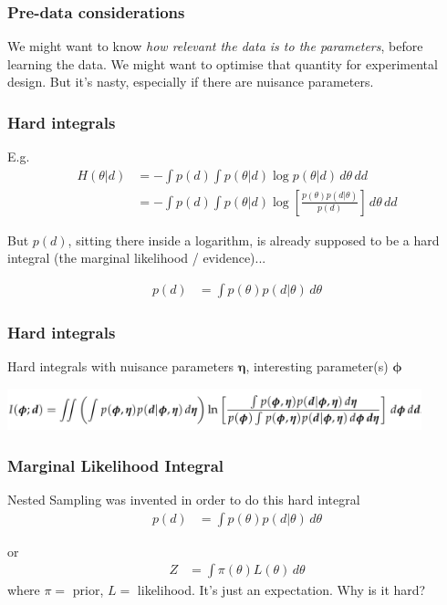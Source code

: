 \documentclass{beamer}
\begin{document}
\begin{frame}
\frametitle{Pre-data considerations}

We might want to know {\em how relevant the data is to the parameters},
before learning the data. We might want to optimise that quantity for
experimental design. But it's nasty, especially if there are nuisance
parameters.
\end{frame}


\begin{frame}
\frametitle{Hard integrals}

E.g.
\begin{align}
H(\theta|d) &= -\int p(d) \int p(\theta|d) \log p(\theta|d) \, d\theta \, dd \\
            &= -\int p(d) \int p(\theta|d)
                    \log\left[\frac{p(\theta)p(d|\theta)}{p(d)}\right] \, d\theta \, dd
\end{align}

But $p(d)$, sitting there inside a logarithm, is already supposed to be
a hard integral (the marginal likelihood / evidence)...

\begin{align}
p(d) &= \int p(\theta) p(d|\theta) \, d\theta
\end{align}

\end{frame}


\begin{frame}
\frametitle{Hard integrals}
Hard integrals with nuisance parameters
$\boldsymbol{\eta}$, interesting parameter(s)
$\boldsymbol{\phi}$
\vspace{0.5em}

\begin{center}
\includegraphics[width=0.9\textwidth]{hard-integrals.png}
\end{center}

\end{frame}


\begin{frame}
\frametitle{Marginal Likelihood Integral}
Nested Sampling was invented in order to do this hard integral
\begin{align}
p(d) &= \int p(\theta) p(d|\theta) \, d\theta
\end{align}

or
\begin{align}
Z &= \int \pi(\theta) L(\theta) \, d\theta
\end{align}
where $\pi=$ prior, $L=$ likelihood.
It's just an expectation. Why is it hard?
\end{frame}
\end{document}
